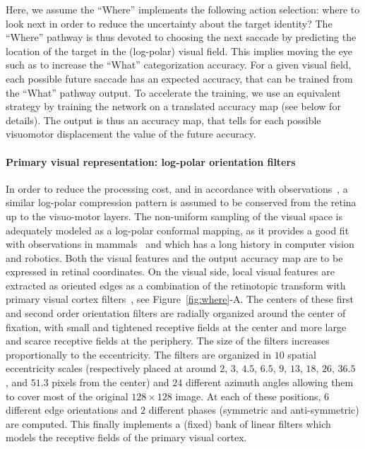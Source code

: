 Here, we assume the ``Where'' implements the following action selection: where to look next in order to reduce the uncertainty about the target identity?
The ``Where'' pathway is thus devoted to choosing the next saccade by predicting the location of the target in the (log-polar) visual field.
This implies moving the eye such as to increase the ``What'' categorization accuracy. For a given visual field, each possible future saccade has an expected accuracy, that can be trained from the ``What'' pathway output. To accelerate the training, we use an equivalent strategy by training the network on a translated accuracy map (see below for details). The output is thus an accuracy map, that tells for each possible visuomotor displacement the value of the future accuracy.

\paragraph{Primary visual representation: log-polar orientation filters}
In order to reduce the processing cost, and in accordance with observations~\cite{connolly1984representation,sparks1987sensory}, a similar log-polar compression pattern is assumed to be conserved from the retina up to the visuo-motor layers.
The non-uniform sampling of the visual space is adequately modeled as a log-polar conformal mapping, as it provides a good fit with observations in mammals~\cite{Traver10} and which has a long history in computer vision and robotics. Both the visual features and the output accuracy map are to be expressed in retinal coordinates. On the visual side, local visual features are extracted as oriented edges as a combination of the retinotopic transform with primary visual cortex filters~\cite{Fischer2007a}, see Figure~\ref{fig:where}-A. The centers of these first and second order orientation filters are radially organized around the center of fixation, with small and tightened receptive fields at the center and more large and scarce receptive fields at the periphery. The size of the filters increases proportionally to the eccentricity.  The filters are organized in $10$ spatial eccentricity scales (respectively placed at around $2$, $3$, $4.5$, $6.5$, $9$, $13$, $18$, $26$, $36.5$ , and $51.3$ pixels from the center) and $24$ different azimuth angles allowing them to cover most of the original $128 \times 128 $ image. At each of these positions, $6$ different edge orientations and $2$ different phases (symmetric and anti-symmetric) are computed. This finally implements a (fixed) bank of linear filters which models the receptive fields of the primary visual cortex.

